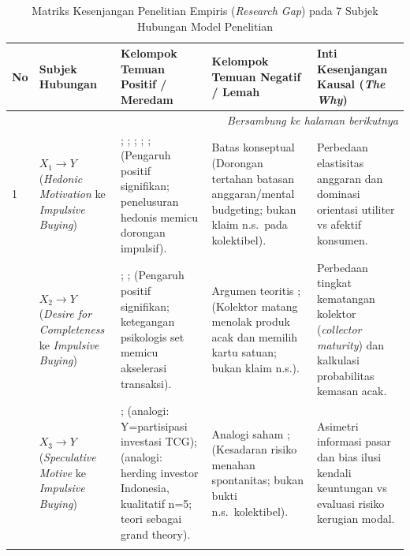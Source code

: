 \documentclass[12pt,a4paper]{article}
\numberwithin{equation}{section}
\numberwithin{table}{section}
\numberwithin{figure}{section}
\begin{document}
\begingroup
\small
\begin{longtable}{p{} p{} p{} p{} p{}}
\caption{Matriks Kesenjangan Penelitian Empiris (\emph{Research Gap}) pada 7 Subjek Hubungan Model Penelitian} \label{tab:research_gap} \\
\toprule
\textbf{No} & \textbf{Subjek Hubungan} & \textbf{Kelompok Temuan Positif / Meredam} & \textbf{Kelompok Temuan Negatif / Lemah} & \textbf{Inti Kesenjangan Kausal (\emph{The Why})} \\
\midrule
\endhead
\midrule
\multicolumn{5}{r}{\footnotesize\textit{Bersambung ke halaman berikutnya}} \\
\endfoot
\bottomrule
\endlastfoot

1 & $X_1 \rightarrow Y$ (\emph{Hedonic Motivation} ke \emph{Impulsive Buying}) & \citet{arnold2003hedonic}; \citet{gueltekin2012influence}; \citet{pranggabayu2022pengaruh}; \citet{gong2024unveiling}; \citet{tirtayasa2020effect}; \citet{zheng2019impact} (Pengaruh positif signifikan; penelusuran hedonis memicu dorongan impulsif). & Batas konseptual \citet{thaler1985mental, thaler1981economic} (Dorongan tertahan batasan anggaran/mental budgeting; bukan klaim n.s.\ pada kolektibel). & Perbedaan elastisitas anggaran dan dominasi orientasi utiliter vs afektif konsumen. \\
\addlinespace[4pt]
2 & $X_2 \rightarrow Y$ (\emph{Desire for Completeness} ke \emph{Impulsive Buying}) & \citet{gao2014completing}; \citet{barasz2017pseudo}; \citet{dewi2026understanding} (Pengaruh positif signifikan; ketegangan psikologis set memicu akselerasi transaksi). & Argumen teoritis \citet{long2000consuming}; \citet{spero2004approach} (Kolektor matang menolak produk acak dan memilih kartu satuan; bukan klaim n.s.). & Perbedaan tingkat kematangan kolektor (\emph{collector maturity}) dan kalkulasi probabilitas kemasan acak. \\
\addlinespace[4pt]
3 & $X_3 \rightarrow Y$ (\emph{Speculative Motive} ke \emph{Impulsive Buying}) & \citet{baur2018bitcoin}; \citet{aryadi2024personal} (analogi: Y=partisipasi investasi TCG); \citet{colline2024biases} (analogi: herding investor Indonesia, kualitatif n=5; teori \citet{shiller2000irrational} sebagai grand theory). & Analogi saham \citet{barber2008all}; \citet{fama1970efficient} (Kesadaran risiko menahan spontanitas; bukan bukti n.s.\ kolektibel). & Asimetri informasi pasar dan bias ilusi kendali keuntungan vs evaluasi risiko kerugian modal. \\
\addlinespace[4pt]

\end{longtable}
\end{document}

